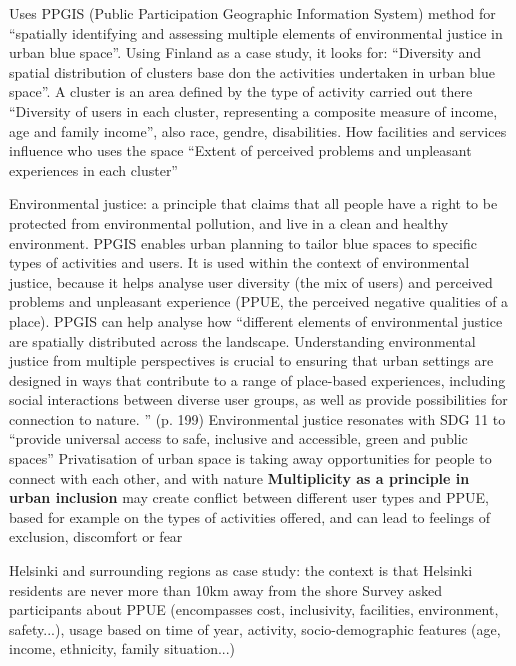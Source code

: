 \documentclass{article}
\newcommand{\alignedmarginpar}[1]{%
        \marginpar{\raggedright\small #1}
    }
\begin{document}
\begin{outline}
	\1 Uses PPGIS (Public Participation Geographic Information System) method for ``spatially identifying and assessing multiple elements of environmental justice in urban blue space''. Using Finland as a case study, it looks for:
		\2 ``Diversity and spatial distribution of clusters base don the activities undertaken in urban blue space''. A cluster is an area defined by the type of activity carried out there
		\2 ``Diversity of users in each cluster, representing a composite measure of income, age and family income'', also race, gendre, disabilities. How facilities and services influence who uses the space
		\2 ``Extent of perceived problems and unpleasant experiences in each cluster'' 

	\1 Environmental justice: a principle that claims that all people have a right to be protected from environmental pollution, and live in a clean and healthy environment. 
		\2  PPGIS enables urban planning to tailor blue spaces to specific types of activities and users. It is used within the context of environmental justice, because it helps analyse user diversity (the mix of users) and perceived problems and unpleasant experience (PPUE, the perceived negative qualities of a place). PPGIS can help analyse how ``different elements of environmental justice are spatially distributed across the landscape. Understanding environmental justice from multiple perspectives is crucial to ensuring that urban settings are designed in ways that contribute to a range of place-based experiences, including social interactions between diverse user groups, as well as provide possibilities for connection to nature. '' (p. 199)
		\2 Environmental justice resonates with SDG 11 to ``provide universal access to safe, inclusive and accessible, green and public spaces''
		\2 Privatisation of urban space is taking away opportunities for people to connect with each other, and with nature
		\2 \textbf{Multiplicity as a principle in urban inclusion} may create conflict between different user types and PPUE, based for example on the types of activities offered, and can lead to feelings of exclusion, discomfort or fear\alignedmarginpar{Inclusivity in public space\\Right to blue space}
	\1 Helsinki and surrounding regions as case study: the context is that Helsinki residents are never more than 10km away from the shore
		\2 Survey asked participants about PPUE (encompasses cost, inclusivity, facilities, environment, safety...), usage based on time of year, activity, socio-demographic features (age, income, ethnicity, family situation...)

\end{outline}
\end{document}
